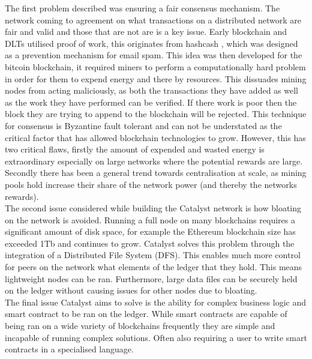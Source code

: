The first problem described was ensuring a fair consensus mechanism. The network coming to agreement on what transactions on a distributed network are fair and valid and those that are not are is a key issue. Early blockchain and DLTs utilised proof of work, this originates from hashcash \cite{back2002hashcash}, which was designed as a prevention mechanism for email spam. This idea was then developed for the bitcoin blockchain, it required miners to perform a computationally hard problem in order for them to expend energy and there by resources. This dissuades mining nodes from acting maliciously, as both the transactions they have added as well as the work they have performed can be verified. If there work is poor then the block they are trying to append to the blockchain will be rejected. This technique for consensus is Byzantine fault tolerant and can not be understated as the critical factor that has allowed blockchain technologies to grow. However, this has two critical flaws, firstly the amount of expended and wasted energy is extraordinary especially on large networks where the potential rewards are large. Secondly there has been a general trend towards centralisation at scale, as mining pools hold increase their share of the network power (and thereby the networks rewards). \\

The second issue considered while building the Catalyst network is how bloating on the network is avoided. Running a full node on many blockchains requires a significant amount of disk space, for example the Ethereum blockchain size has exceeded 1Tb \cite{EthBloat} and continues to grow. Catalyst solves this problem through the integration of a Distributed File System (DFS). This enables much more control for peers on the network what elements of the ledger that they hold. This means lightweight nodes can be ran. Furthermore, large data files can be securely held on the ledger without causing issues for other nodes due to bloating. \\

The final issue Catalyst aims to solve is the ability for complex business logic and smart contract to be ran on the ledger. While smart contracts are capable of being ran on a wide variety of blockchains frequently they are simple and incapable of running complex solutions. Often also requiring a user to write smart contracts in a specialised language. \\